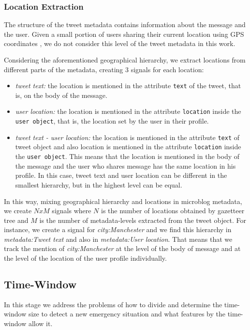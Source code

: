 \documentclass[sigconf]{acmart}
\begin{document}
\subsubsection{Location Extraction}

The structure of the tweet metadata contains information about the message and the user. Given a small portion of users sharing their current location using GPS coordinates \cite{graham2014world}, we do not consider this level of the tweet metadata in this work. 

Considering the aforementioned geographical hierarchy, we extract locations from different parts of the metadata, creating 3 signals for each location:

\begin{itemize}
	\item {\it tweet text:} the location is mentioned in the attribute \texttt{text} of the tweet, that is, on the body of the message.
	\item {\it user location:} the location is mentioned in the attribute \texttt{location} inside the \texttt{user object}, that is, the location set by the user in their profile.
	\item {\it tweet text - user location:} the location is mentioned in the attribute \texttt{text} of tweet object and also location is mentioned in the attribute \texttt{location} inside the \texttt{user object}. This means that the location is mentioned in the body of the message and the user who shares message has the same location in his profile. In this case, tweet text and user location can be different in the smallest hierarchy, but in the highest level can be equal. 
\end{itemize}

In this way, mixing geographical hierarchy and locations in microblog metadata, we create $NxM$ signals where $N$ is the number of locations obtained by gazetteer tree and $M$ is the number of metadata-levels extracted from the tweet object. For instance, we create a signal for \textit{city:Manchester} and we find this hierarchy in \textit{metadata:Tweet text} and also in \textit{metadata:User location}. That means that we track the mention of \textit{city:Manchester} at the level of the body of message and at the level of the location of the user profile individually.

\subsection{Time-Window}
In this stage we address the problems of how to divide and determine the time-window size to detect a new emergency situation and what features by the time-window allow it.
\end{document}
